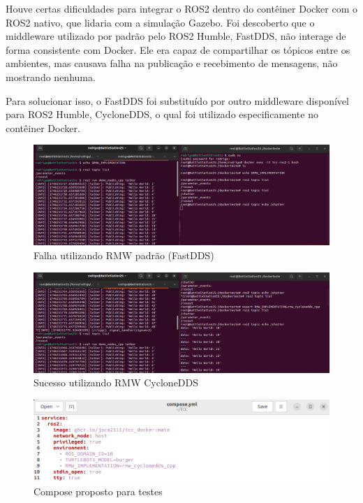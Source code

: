 Houve certas dificuldades para integrar o ROS2 dentro do contêiner Docker com o ROS2 nativo, que lidaria com a simulação Gazebo. Foi descoberto que o middleware utilizado por padrão pelo ROS2 Humble, FastDDS, não interage de forma consistente com Docker. Ele era capaz de compartilhar os tópicos entre os ambientes, mas causava falha na publicação e recebimento de mensagens, não mostrando nenhuma.

Para solucionar isso, o FastDDS foi substituído por outro middleware disponível para ROS2 Humble, CycloneDDS, o qual foi utilizado especificamente no contêiner Docker.

\begin{figure}[htb]
    \centering
    \includegraphics[width=1\linewidth]{Figures/TestePadraoFalha.png}
    \caption{Falha utilizando RMW padrão (FastDDS)}
    \label{fig:enter-label}
\end{figure}
\begin{figure}[htb]
    \centering
    \includegraphics[width=1\linewidth]{Figures/TesteCycloneSucesso.png}
    \caption{Sucesso utilizando RMW CycloneDDS }
    \label{fig:enter-label}
\end{figure}
\begin{figure}[htb]
    \centering
    \includegraphics[width=1\linewidth]{Figures/ComposeFinal.png}
    \caption{Compose proposto para testes}
    \label{fig:enter-label}
\end{figure}
